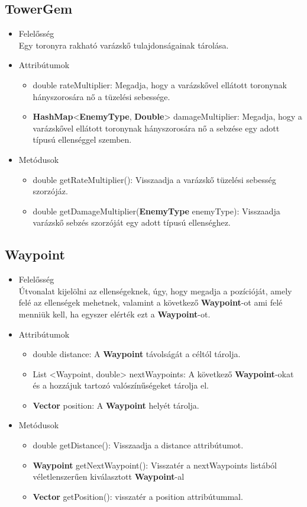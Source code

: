 \subsection{TowerGem}
\begin{itemize}
\item Felelősség\\
Egy toronyra rakható varázskő tulajdonságainak tárolása.
\item Attribútumok
	\begin{itemize}
		\item double rateMultiplier: Megadja, hogy a varázskővel ellátott toronynak hányszorosára nő a tüzelési sebessége.
		\item \textbf{HashMap}<\textbf{EnemyType}, \textbf{Double}> damageMultiplier: Megadja, hogy a varázskővel ellátott toronynak hányszorosára nő a sebzése egy adott típusú ellenséggel szemben.
	\end{itemize}
\item Metódusok
	\begin{itemize}
		\item double getRateMultiplier(): Visszaadja a varázskő tüzelési sebesség szorzójáz.
		\item double getDamageMultiplier(\textbf{EnemyType} enemyType): Visszaadja varázskő sebzés szorzóját egy adott típusú ellenséghez.
	\end{itemize}
\end{itemize}


\subsection{Waypoint}
\begin{itemize}
\item Felelősség\\
Útvonalat kijelölni az ellenségeknek, úgy, hogy megadja a pozícióját, amely felé az ellenségek mehetnek, valamint a következő  \textbf{Waypoint}-ot ami felé menniük kell, ha egyszer elérték ezt a  \textbf{Waypoint}-ot.
\item Attribútumok
	\begin{itemize}
		\item double distance: A  \textbf{Waypoint} távolságát a céltól tárolja.
		\item List <Waypoint, double> nextWaypoints: A következő  \textbf{Waypoint}-okat és a hozzájuk tartozó valószínűségeket tárolja el.
		\item \textbf{Vector} position: A  \textbf{Waypoint} helyét tárolja.
	\end{itemize}
\item Metódusok
	\begin{itemize}
		\item double getDistance(): Visszaadja a distance attribútumot.
		\item \textbf{Waypoint} getNextWaypoint(): Visszatér a nextWaypoints listából véletlenszerűen kiválasztott \textbf{Waypoint}-al
		\item\textbf{Vector} getPosition(): visszatér a position attribútummal.

	\end{itemize}
\end{itemize}



